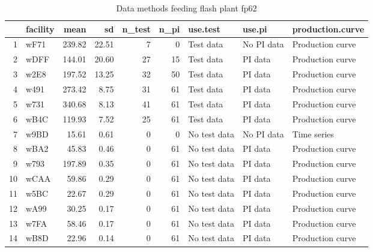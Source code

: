 \begin{table}[H]
\centering
\begin{tabular}{rlrrrrlll}
  \hline
 & facility & mean & sd & n\_test & n\_pi & use.test & use.pi & production.curve \\ 
  \hline
1 & wF71 & 239.82 & 22.51 &   7 &   0 & Test data & No PI data & Production curve \\ 
  2 & wDFF & 144.01 & 20.60 &  27 &  15 & Test data & PI data & Production curve \\ 
  3 & w2E8 & 197.52 & 13.25 &  32 &  50 & Test data & PI data & Production curve \\ 
  4 & w491 & 273.42 & 8.75 &  31 &  61 & Test data & PI data & Production curve \\ 
  5 & w731 & 340.68 & 8.13 &  41 &  61 & Test data & PI data & Production curve \\ 
  6 & wB4C & 119.93 & 7.52 &  25 &  61 & Test data & PI data & Production curve \\ 
  7 & w9BD & 15.61 & 0.61 &   0 &   0 & No test data & No PI data & Time series \\ 
  8 & wBA2 & 45.83 & 0.46 &   0 &  61 & No test data & PI data & Production curve \\ 
  9 & w793 & 197.89 & 0.35 &   0 &  61 & No test data & PI data & Production curve \\ 
  10 & wCAA & 59.86 & 0.29 &   0 &  61 & No test data & PI data & Production curve \\ 
  11 & w5BC & 22.67 & 0.29 &   0 &  61 & No test data & PI data & Production curve \\ 
  12 & wA99 & 30.25 & 0.17 &   0 &  61 & No test data & PI data & Production curve \\ 
  13 & w7FA & 58.46 & 0.17 &   0 &  61 & No test data & PI data & Production curve \\ 
  14 & wB8D & 22.96 & 0.14 &   0 &  61 & No test data & PI data & Production curve \\ 
   \hline
\end{tabular}
\caption{Data methods feeding flash plant fp62} 
\label{tab:well_summaries_fp15}
\end{table}
